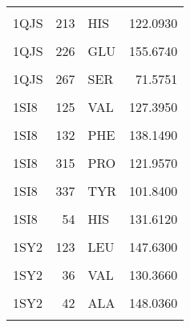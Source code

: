 \begin{table}
\begin{tabular}{lrlr}
			\cellcolor{gray!6}{1QJS} & \cellcolor{gray!6}{204} & \cellcolor{gray!6}{TYR} & \cellcolor{gray!6}{82.0806}\\
			1QJS & 213 & HIS & 122.0930\\
			\addlinespace
			\cellcolor{gray!6}{1QJS} & \cellcolor{gray!6}{214} & \cellcolor{gray!6}{ARG} & \cellcolor{gray!6}{70.2144}\\
			1QJS & 226 & GLU & 155.6740\\
			\cellcolor{gray!6}{1QJS} & \cellcolor{gray!6}{266} & \cellcolor{gray!6}{HIS} & \cellcolor{gray!6}{120.9930}\\
			1QJS & 267 & SER & 71.5751\\
			\cellcolor{gray!6}{1QJS} & \cellcolor{gray!6}{268} & \cellcolor{gray!6}{TRP} & \cellcolor{gray!6}{64.5387}\\
			\addlinespace
			1SI8 & 125 & VAL & 127.3950\\
			\cellcolor{gray!6}{1SI8} & \cellcolor{gray!6}{127} & \cellcolor{gray!6}{ASN} & \cellcolor{gray!6}{103.3680}\\
			1SI8 & 132 & PHE & 138.1490\\
			\cellcolor{gray!6}{1SI8} & \cellcolor{gray!6}{140} & \cellcolor{gray!6}{PHE} & \cellcolor{gray!6}{139.2170}\\
			1SI8 & 315 & PRO & 121.9570\\
			\addlinespace
			\cellcolor{gray!6}{1SI8} & \cellcolor{gray!6}{333} & \cellcolor{gray!6}{ARG} & \cellcolor{gray!6}{116.1170}\\
			1SI8 & 337 & TYR & 101.8400\\
			\cellcolor{gray!6}{1SI8} & \cellcolor{gray!6}{53} & \cellcolor{gray!6}{VAL} & \cellcolor{gray!6}{132.7600}\\
			1SI8 & 54 & HIS & 131.6120\\
			\cellcolor{gray!6}{1SY2} & \cellcolor{gray!6}{121} & \cellcolor{gray!6}{THR} & \cellcolor{gray!6}{142.1010}\\
			\addlinespace
			1SY2 & 123 & LEU & 147.6300\\
			\cellcolor{gray!6}{1SY2} & \cellcolor{gray!6}{133} & \cellcolor{gray!6}{LEU} & \cellcolor{gray!6}{171.7810}\\
			1SY2 & 36 & VAL & 130.3660\\
			\cellcolor{gray!6}{1SY2} & \cellcolor{gray!6}{40} & \cellcolor{gray!6}{TYR} & \cellcolor{gray!6}{145.2220}\\
			1SY2 & 42 & ALA & 148.0360\\
			\addlinespace
			\cellcolor{gray!6}{1SY2} & \cellcolor{gray!6}{57} & \cellcolor{gray!6}{LEU} & \cellcolor{gray!6}{142.4070}\\

\end{tabular}
\end{table}
